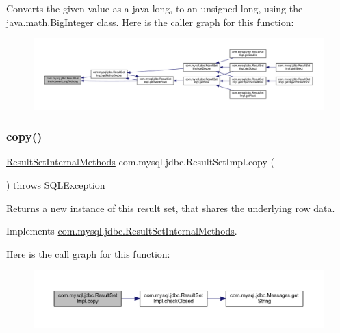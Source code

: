 Converts the given value as a java long, to an \textquotesingle{}unsigned\textquotesingle{} long, using the java.\+math.\+Big\+Integer class. Here is the caller graph for this function\+:
\nopagebreak
\begin{figure}[H]
\begin{center}
\leavevmode
\includegraphics[width=350pt]{classcom_1_1mysql_1_1jdbc_1_1_result_set_impl_a16e3f459e97906fb255efd74d2ee34c1_icgraph}
\end{center}
\end{figure}
\mbox{\label{classcom_1_1mysql_1_1jdbc_1_1_result_set_impl_a4f2a8d2b18832126779e992109371a59}} 
\subsubsection{\texorpdfstring{copy()}{copy()}}
{\footnotesize\ttfamily \mbox{\hyperlink{interfacecom_1_1mysql_1_1jdbc_1_1_result_set_internal_methods}{Result\+Set\+Internal\+Methods}} com.\+mysql.\+jdbc.\+Result\+Set\+Impl.\+copy (\begin{DoxyParamCaption}{ }\end{DoxyParamCaption}) throws S\+Q\+L\+Exception}

Returns a new instance of this result set, that shares the underlying row data. 

Implements \mbox{\hyperlink{interfacecom_1_1mysql_1_1jdbc_1_1_result_set_internal_methods_aa9fcef476bda66d0c230ef68931a44cf}{com.\+mysql.\+jdbc.\+Result\+Set\+Internal\+Methods}}.

Here is the call graph for this function\+:
\nopagebreak
\begin{figure}[H]
\begin{center}
\leavevmode
\includegraphics[width=350pt]{classcom_1_1mysql_1_1jdbc_1_1_result_set_impl_a4f2a8d2b18832126779e992109371a59_cgraph}
\end{center}
\end{figure}
\mbox{\label{classcom_1_1mysql_1_1jdbc_1_1_result_set_impl_af928ac0eb3a309fb2bf6c31d86cc2b32}} 
